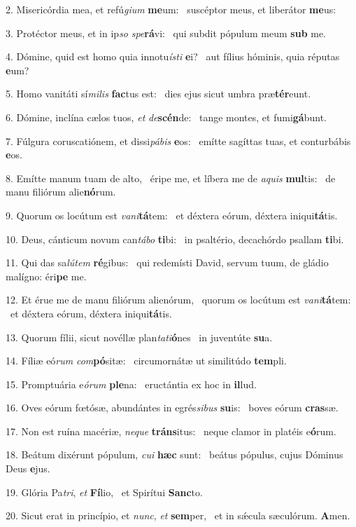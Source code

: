 2. Misericórdia mea, et refú\textit{gi}\textit{um} \textbf{me}um: \ast\  suscéptor meus, et liberátor \textbf{me}us:\

3. Protéctor meus, et in ip\textit{so} \textit{spe}\textbf{rá}vi: \ast\  qui subdit pópulum meum \textbf{sub} me.\

4. Dómine, quid est homo quia innotu\textit{ís}\textit{ti} \textbf{e}i? \ast\  aut fílius hóminis, quia réputas \textbf{e}um?\

5. Homo vanitáti sí\textit{mi}\textit{lis} \textbf{fac}tus est: \ast\  dies ejus sicut umbra præ\textbf{tér}eunt.\

6. Dómine, inclína cælos tuos, \textit{et} \textit{de}\textbf{scén}de: \ast\  tange montes, et fumi\textbf{gá}bunt.\

7. Fúlgura coruscatiónem, et dissi\textit{pá}\textit{bis} \textbf{e}os: \ast\  emítte sagíttas tuas, et conturbábis \textbf{e}os.\

8. Emítte manum tuam de alto, \dag\  éripe me, et líbera me de \textit{a}\textit{quis} \textbf{mul}tis: \ast\  de manu filiórum alie\textbf{nó}rum.\

9. Quorum os locútum est \textit{va}\textit{ni}\textbf{tá}tem: \ast\  et déxtera eórum, déxtera iniqui\textbf{tá}tis.\

10. Deus, cánticum novum can\textit{tá}\textit{bo} \textbf{ti}bi: \ast\  in psaltério, decachórdo psallam \textbf{ti}bi.\

11. Qui das sa\textit{lú}\textit{tem} \textbf{ré}gibus: \ast\  qui redemísti David, servum tuum, de gládio malígno: éri\textbf{pe} me.\

12. Et érue me de manu filiórum alienórum, \dag\  quorum os locútum est \textit{va}\textit{ni}\textbf{tá}tem: \ast\  et déxtera eórum, déxtera iniqui\textbf{tá}tis.\

13. Quorum fílii, sicut novéllæ plan\textit{ta}\textit{ti}\textbf{ó}nes \ast\  in juventúte \textbf{su}a.\

14. Fíliæ eó\textit{rum} \textit{com}\textbf{pó}sitæ: \ast\  circumornátæ ut similitúdo \textbf{tem}pli.\

15. Promptuária e\textit{ó}\textit{rum} \textbf{ple}na: \ast\  eructántia ex hoc in \textbf{il}lud.\

16. Oves eórum fœtósæ, abundántes in egrés\textit{si}\textit{bus} \textbf{su}is: \ast\  boves eórum \textbf{cras}sæ.\

17. Non est ruína macériæ, \textit{ne}\textit{que} \textbf{tráns}itus: \ast\  neque clamor in platéis e\textbf{ó}rum.\

18. Beátum dixérunt pópulum, \textit{cu}\textit{i} \textbf{hæc} sunt: \ast\  beátus pópulus, cujus Dóminus Deus \textbf{e}jus.\

19. Glória Pa\textit{tri}, \textit{et} \textbf{Fí}lio, \ast\  et Spirítui \textbf{Sanc}to.\

20. Sicut erat in princípio, et \textit{nunc}, \textit{et} \textbf{sem}per, \ast\  et in sǽcula sæculórum. \textbf{A}men.\

